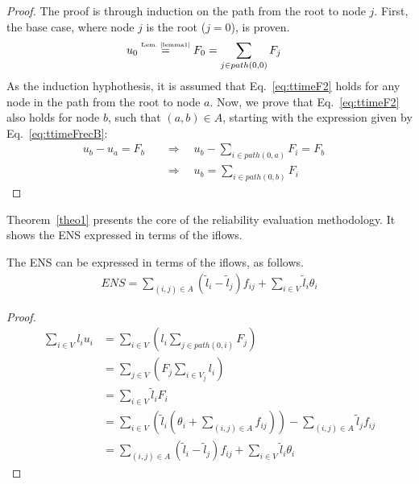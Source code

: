 \begin{proof}
	The proof is through induction on the path from the root to node $j$. First, the base case, where node $j$ is the root ($j=0$), is proven.
 	\begin{align}
 	    u_0 &\stackrel{\mbox{\tiny Lem.~\ref{lemma1}}}{=} F_0 = \sum_{j \in path(0,0)}{F_j} \nonumber
	\end{align}
	As the induction hyphothesis, it is assumed that Eq.~\eqref{eq:ttimeF2} holds for any node in the path from the root to node $a$. Now, we prove that Eq.~\eqref{eq:ttimeF2} also holds for node $b$, such that $(a,b) \in A$, starting with the expression given by Eq.~\eqref{eq:ttimeFrecB}:
 	\begin{align}
     	\displaystyle
 	    u_b - u_a = F_b \quad &\Rightarrow \quad u_b - \sum_{i \in path(0,a)}{F_i} = F_b \nonumber \quad \nonumber \\ &\Rightarrow \quad u_b = \sum_{i \in path(0,b)}{F_i} \nonumber
	\end{align}
\end{proof}

Theorem~\ref{theo1} presents the core of the reliability evaluation methodology. It shows the ENS expressed in terms of the iflows. 

\begin{theorem} \label{theo1}
The ENS can be expressed in terms of the iflows, as follows.
 	\begin{align} \label{eq:ENS2}
		\displaystyle ENS = \sum_{(i,j) \in A}{(\tilde{l}_i-\tilde{l}_j)f_{ij}} + \sum_{i \in V}{\tilde{l}_i\theta_{i}}
	\end{align}
\end{theorem}
\begin{proof}
	\begin{subequations} 
	\begin{align}
        \displaystyle \sum_{i \in V}{l_iu_i} &= \sum_{i \in V}{\left( l_i\sum_{j \in path(0,i)}{F_j} \right)} \label{eq:ens_a}  \\
		&= \sum_{j \in V}{\left( F_j\sum_{i \in V_j}{l_i} \right)} \label{eq:ens_b} \\
		&= \sum_{i \in V}{\tilde{l}_iF_i} \label{eq:ens_c} \\
		&= \sum_{i \in V}{\left( \tilde{l}_i\left(\theta_i + \sum_{(i,j) \in A}{f_{ij}} \right) \right)} - \sum_{(i,j) \in A}{\tilde{l}_jf_{ij}} \label{eq:ens_d}	 \\
		&= \sum_{(i,j) \in A}{(\tilde{l}_i-\tilde{l}_j)f_{ij}} + \sum_{i \in V}{\tilde{l}_i\theta_{i}} \label{eq:ens_e}
	\end{align}
	\end{subequations}
\end{proof}

